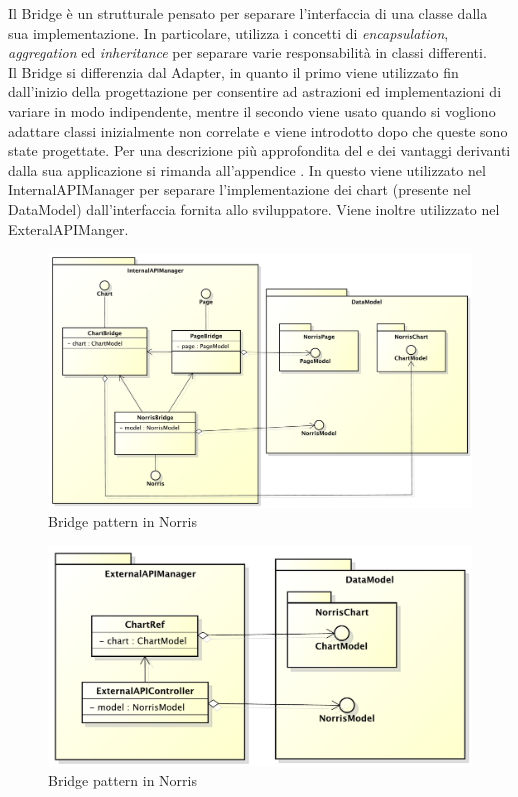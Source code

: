 			Il Bridge è un  strutturale pensato per separare l'interfaccia di una classe dalla sua implementazione. In particolare, utilizza i concetti di \textit{encapsulation}, \textit{aggregation} ed \textit{inheritance} per separare varie responsabilità in classi differenti. \\
			Il  Bridge si differenzia dal  Adapter, in quanto il primo viene utilizzato fin dall'inizio della progettazione per consentire ad astrazioni ed implementazioni di variare in modo indipendente, mentre il secondo viene usato quando si vogliono adattare classi inizialmente non correlate e viene introdotto dopo che queste sono state progettate.
			Per una descrizione più approfondita del  e dei vantaggi derivanti dalla sua applicazione si rimanda all'appendice .
				In  questo  viene utilizzato nel  InternalAPIManager per separare l'implementazione dei chart (presente nel  DataModel) dall'interfaccia fornita allo sviluppatore. Viene inoltre utilizzato nel  ExteralAPIManger.
				\begin{figure}[H]\centering
	        		\includegraphics[width=\textwidth]{SpecificaTecnica/Pics/DesignPatternNorris/Bridge1}
	        		\caption{Bridge pattern in Norris}
	    		\end{figure}
	    		\begin{figure}[H]\centering
	        		\includegraphics[width=\textwidth]{SpecificaTecnica/Pics/DesignPatternNorris/Bridge2}
	        		\caption{Bridge pattern in Norris}
	    		\end{figure}	
				
